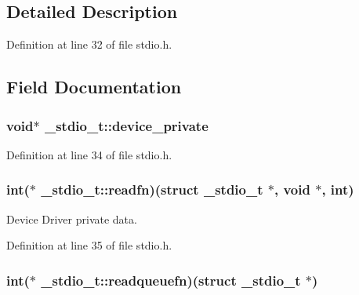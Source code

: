 \subsection{Detailed Description}


Definition at line 32 of file stdio.\-h.



\subsection{Field Documentation}
\hypertarget{struct__stdio__t_abe889179e50490e5eb8d2a3592166638}{
\subsubsection[{device\-\_\-private}]{\setlength{\rightskip}{0pt plus 5cm}void$\ast$ \-\_\-stdio\-\_\-t\-::device\-\_\-private}}\label{struct__stdio__t_abe889179e50490e5eb8d2a3592166638}


Definition at line 34 of file stdio.\-h.

\hypertarget{struct__stdio__t_a3698bb7d1020290bd662cf2e31c9d2c9}{
\subsubsection[{readfn}]{\setlength{\rightskip}{0pt plus 5cm}int($\ast$ \-\_\-stdio\-\_\-t\-::readfn)(struct {\bf \-\_\-stdio\-\_\-t} $\ast$, void $\ast$, int)}}\label{struct__stdio__t_a3698bb7d1020290bd662cf2e31c9d2c9}


Device Driver private data. 



Definition at line 35 of file stdio.\-h.

\hypertarget{struct__stdio__t_a302b5c7d886e2ad5831e7fb40129d10e}{
\subsubsection[{readqueuefn}]{\setlength{\rightskip}{0pt plus 5cm}int($\ast$ \-\_\-stdio\-\_\-t\-::readqueuefn)(struct {\bf \-\_\-stdio\-\_\-t} $\ast$)}}\label{struct__stdio__t_a302b5c7d886e2ad5831e7fb40129d10e}


